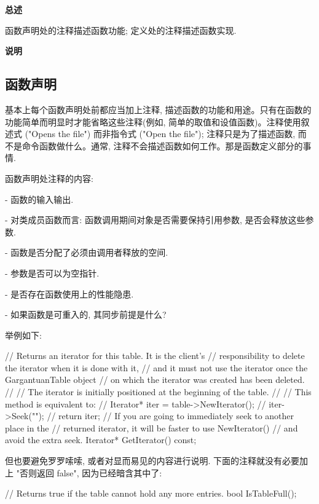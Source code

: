 \textbf{总述}

函数声明处的注释描述函数功能; 定义处的注释描述函数实现.

\textbf{说明}

\subsection{函数声明}

基本上每个函数声明处前都应当加上注释, 描述函数的功能和用途。只有在函数的功能简单而明显时才能省略这些注释(例如, 简单的取值和设值函数)。注释使用叙述式 ("Opens the file") 而非指令式 ("Open the file"); 注释只是为了描述函数, 而不是命令函数做什么。通常, 注释不会描述函数如何工作。那是函数定义部分的事情.

函数声明处注释的内容:

- 函数的输入输出.

- 对类成员函数而言: 函数调用期间对象是否需要保持引用参数, 是否会释放这些参数.

- 函数是否分配了必须由调用者释放的空间.

- 参数是否可以为空指针.

- 是否存在函数使用上的性能隐患.

- 如果函数是可重入的, 其同步前提是什么?

举例如下:

\begin{cppcode}
// Returns an iterator for this table.  It is the client's
// responsibility to delete the iterator when it is done with it,
// and it must not use the iterator once the GargantuanTable object
// on which the iterator was created has been deleted.
//
// The iterator is initially positioned at the beginning of the table.
//
// This method is equivalent to:
//    Iterator* iter = table->NewIterator();
//    iter->Seek("");
//    return iter;
// If you are going to immediately seek to another place in the
// returned iterator, it will be faster to use NewIterator()
// and avoid the extra seek.
  Iterator* GetIterator() const;
\end{cppcode}

但也要避免罗罗嗦嗦, 或者对显而易见的内容进行说明. 下面的注释就没有必要加上 "否则返回 false", 因为已经暗含其中了:

\begin{cppcode}
// Returns true if the table cannot hold any more entries.
bool IsTableFull();
\end{cppcode}

